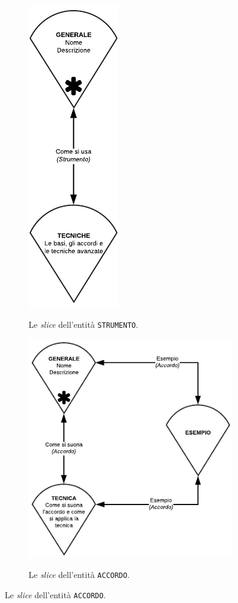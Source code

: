 \begin{figure}[H]
	\begin{subfigure}[t]{.33\textwidth}
		\centering
		\includegraphics[scale=1]{../modello_rmm/slice_strumento}
		\label{fig:slice:strumento}
		\caption{Le \emph{slice} dell'entità \texttt{STRUMENTO}.}
	\end{subfigure}%
	\begin{subfigure}[t]{.66\textwidth}
		\centering
		\includegraphics[scale=1]{../modello_rmm/slice_accordo}
		\label{fig:slice:accordo}
		\caption{Le \emph{slice} dell'entità \texttt{ACCORDO}.}
	\end{subfigure}
\end{figure}
